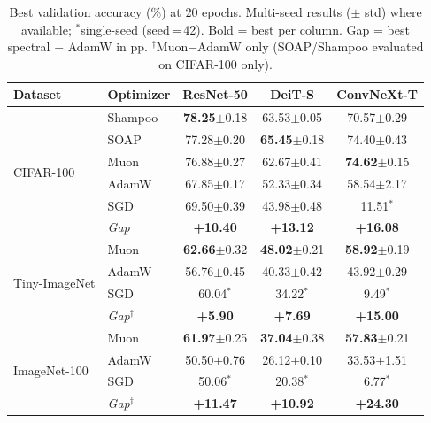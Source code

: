 \begin{table}[t]
\centering
\caption{Best validation accuracy (\%) at 20 epochs. Multi-seed results ($\pm$ std) where available; $^*$single-seed (seed\,=\,42). Bold = best per column. Gap = best spectral $-$ AdamW in pp. $^\dagger$Muon$-$AdamW only (SOAP/Shampoo evaluated on CIFAR-100 only).}
\label{tab:main_results}
\vspace{-0.5em}
\small
\begin{tabular}{@{}llccc@{}}
\toprule
Dataset & Optimizer & ResNet-50 & DeiT-S & ConvNeXt-T \\
\midrule
\multirow{6}{*}{CIFAR-100}
  & Shampoo & \textbf{78.25}{\scriptsize$\pm$0.18} & 63.53{\scriptsize$\pm$0.05} & 70.57{\scriptsize$\pm$0.29} \\
  & SOAP  & 77.28{\scriptsize$\pm$0.20} & \textbf{65.45}{\scriptsize$\pm$0.18} & 74.40{\scriptsize$\pm$0.43} \\
  & Muon  & 76.88{\scriptsize$\pm$0.27} & 62.67{\scriptsize$\pm$0.41} & \textbf{74.62}{\scriptsize$\pm$0.15} \\
  & AdamW & 67.85{\scriptsize$\pm$0.17} & 52.33{\scriptsize$\pm$0.34} & 58.54{\scriptsize$\pm$2.17} \\
  & SGD   & 69.50{\scriptsize$\pm$0.39} & 43.98{\scriptsize$\pm$0.48} & 11.51$^*$ \\
\midrule
  & \textit{Gap} & \textbf{+10.40} & \textbf{+13.12} & \textbf{+16.08} \\
\midrule
\multirow{4}{*}{Tiny-ImageNet}
  & Muon  & \textbf{62.66}{\scriptsize$\pm$0.32} & \textbf{48.02}{\scriptsize$\pm$0.21} & \textbf{58.92}{\scriptsize$\pm$0.19} \\
  & AdamW & 56.76{\scriptsize$\pm$0.45} & 40.33{\scriptsize$\pm$0.42} & 43.92{\scriptsize$\pm$0.29} \\
  & SGD   & 60.04$^*$ & 34.22$^*$ & 9.49$^*$ \\
\midrule
  & \textit{Gap$^\dagger$} & \textbf{+5.90} & \textbf{+7.69} & \textbf{+15.00} \\
\midrule
\multirow{4}{*}{ImageNet-100}
  & Muon  & \textbf{61.97}{\scriptsize$\pm$0.25} & \textbf{37.04}{\scriptsize$\pm$0.38} & \textbf{57.83}{\scriptsize$\pm$0.21} \\
  & AdamW & 50.50{\scriptsize$\pm$0.76} & 26.12{\scriptsize$\pm$0.10} & 33.53{\scriptsize$\pm$1.51} \\
  & SGD   & 50.06$^*$ & 20.38$^*$ & 6.77$^*$ \\
\midrule
  & \textit{Gap$^\dagger$} & \textbf{+11.47} & \textbf{+10.92} & \textbf{+24.30} \\
\bottomrule
\end{tabular}
\vspace{-0.5em}
\end{table}

